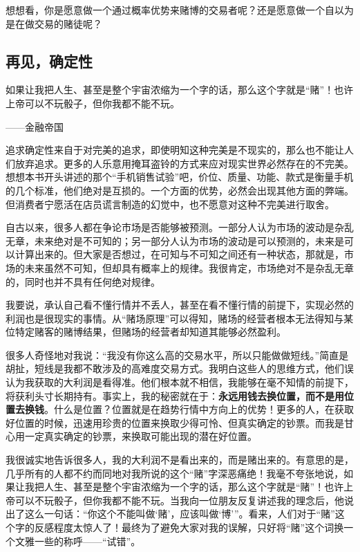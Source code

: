 想想看，你是愿意做一个通过概率优势来赌博的交易者呢？还是愿意做一个自以为是在做交易的赌徒呢？

\subsection{再见，确定性}

{\kaishu
如果让我把人生、甚至是整个宇宙浓缩为一个字的话，那么这个字就是“赌”！也许上帝可以不玩骰子，但你我都不能不玩。

\hfill ——金融帝国
}

追求确定性来自于对完美的追求，即使明知这种完美是不现实的，那么也不能让人们放弃追求。更多的人乐意用掩耳盗铃的方式来应对现实世界必然存在的不完美。想想本书开头讲述的那个“手机销售试验”吧，价位、质量、功能、款式是衡量手机的几个标准，他们绝对是互损的。一个方面的优势，必然会出现其他方面的弊端。但消费者宁愿活在店员谎言制造的幻觉中，也不愿意对这种不完美进行取舍。

自古以来，很多人都在争论市场是否能够被预测。一部分人认为市场的波动是杂乱无章，未来绝对是不可知的；另一部分人认为市场的波动是可以预测的，未来是可以计算出来的。但大家是否想过，在可知与不可知之间还有一种状态，那就是，市场的未来虽然不可知，但却具有概率上的规律。我很肯定，市场绝对不是杂乱无章的，同时也并不具有任何绝对规律。

我要说，承认自己看不懂行情并不丢人，甚至在看不懂行情的前提下，实现必然的利润也是很现实的事情。从“赌场原理”可以得知，赌场的经营者根本无法得知与某位特定赌客的赌博结果，但赌场的经营者却知道其能够必然盈利。

很多人奇怪地对我说：“我没有你这么高的交易水平，所以只能做做短线。”简直是胡扯，短线是我都不敢涉及的高难度交易方式。我明白这些人的思维方式，他们误认为我获取的大利润是看得准。他们根本就不相信，我能够在毫不知情的前提下，将获利头寸长期持有。事实上，我的秘密就在于：\textbf{永远用钱去换位置，而不是用位置去换钱}。什么是位置？位置就是在趋势行情中方向上的优势！更多的人，在获取好位置的时候，迅速用珍贵的位置来换取少得可怜、但真实确定的钞票。而我是甘心用一定真实确定的钞票，来换取可能出现的潜在好位置。

我很诚实地告诉很多人，我的大利润不是看出来的，而是赌出来的。有意思的是，几乎所有的人都不约而同地对我所说的这个“赌”字深恶痛绝！我毫不夸张地说，如果让我把人生、甚至是整个宇宙浓缩为一个字的话，那么这个字就是“赌”！也许上帝可以不玩骰子，但你我都不能不玩。当我向一位朋友反复讲述我的理念后，他说出了这么一句话：“你这个不能叫做‘赌’，应该叫做‘博’”。看来，人们对于“赌”这个字的反感程度太惊人了！最终为了避免大家对我的误解，只好将“赌”这个词换一个文雅一些的称呼——“试错”。

